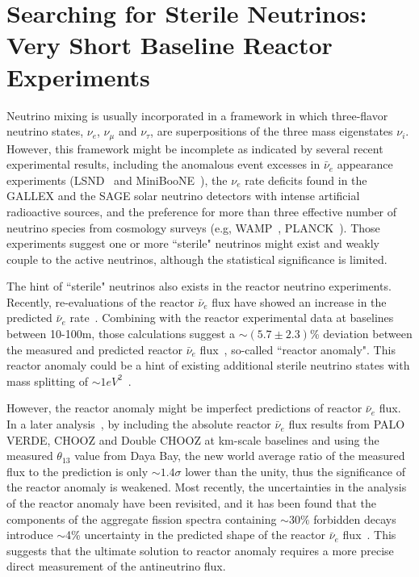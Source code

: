 \section{Searching for Sterile Neutrinos: Very Short Baseline Reactor Experiments}

Neutrino mixing is usually incorporated in a framework in which three-flavor neutrino states, $\nu_e$, $\nu_\mu$ and $\nu_\tau$, are superpositions of the three mass eigenstates $\nu_i$. However, this framework might be incomplete as indicated by several recent experimental results, including the anomalous event excesses in $\bar\nu_e$ appearance experiments (LSND~\cite{LSND2001} and MiniBooNE~\cite{MiniBooNE2013}), the $\nu_e$ rate deficits found in the GALLEX and the SAGE solar neutrino detectors with intense artificial radioactive sources, and the preference for more than three effective number of neutrino species from cosmology surveys (e.g, WAMP~\cite{WMAP2011}, PLANCK~\cite{PLANCK2013}). Those experiments suggest one or more ``sterile" neutrinos might exist and weakly couple to the active neutrinos, although the statistical significance is limited.

The hint of ``sterile" neutrinos also exists in the reactor neutrino experiments. Recently, re-evaluations of the reactor $\bar\nu_e$ flux have showed an increase in the predicted $\bar\nu_e$ rate~\cite{Mueller2011, Huber2011}. Combining with the reactor experimental data at baselines between 10-100m, those calculations suggest a $\sim(5.7\pm2.3)$\% deviation between the measured and predicted reactor $\bar\nu_e$ flux~\cite{Mention2011}, so-called ``reactor anomaly". This reactor anomaly could be a hint of existing additional sterile neutrino states with mass splitting of $\sim1 eV^2$~\cite{Guinti2011}.

However, the reactor anomaly might be imperfect predictions of reactor $\bar\nu_e$ flux. In a later analysis~\cite{Zhang13}, by including the absolute reactor $\bar\nu_e$ flux results from PALO VERDE, CHOOZ and Double CHOOZ at km-scale baselines and using the measured $\theta_{13}$ value from Daya Bay, the new world average ratio of the measured flux to the prediction is only $\sim1.4\sigma$ lower than the unity, thus the significance of the reactor anomaly is weakened. Most recently, the uncertainties in the analysis of the reactor anomaly have been revisited, and it has been found that the components of the aggregate fission spectra containing $\sim30\%$ forbidden decays introduce $\sim$4\% uncertainty in the predicted shape of the reactor $\bar\nu_e$ flux~\cite{Hayes}. This suggests that the ultimate solution to reactor anomaly requires a more precise direct measurement of the antineutrino flux.

